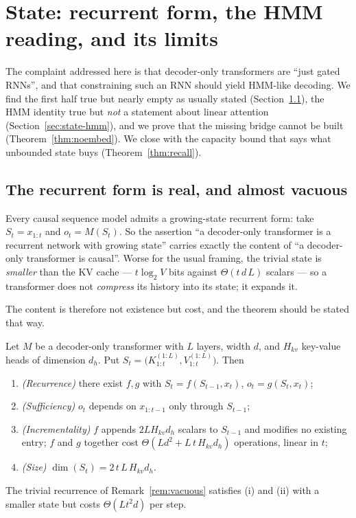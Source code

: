 \section{State: recurrent form, the HMM reading, and its limits}
\label{sec:state}

The complaint addressed here is that decoder-only transformers are ``just gated
RNNs'', and that constraining such an RNN should yield HMM-like decoding. We
find the first half true but nearly empty as usually stated
(Section~\ref{sec:state-form}), the HMM identity true but \emph{not} a statement
about linear attention (Section~\ref{sec:state-hmm}), and we prove that the
missing bridge cannot be built (Theorem~\ref{thm:noembed}). We close with the
capacity bound that says what unbounded state buys
(Theorem~\ref{thm:recall}).

\subsection{The recurrent form is real, and almost vacuous}
\label{sec:state-form}

\begin{remark}
\label{rem:vacuous}
Every causal sequence model admits a growing-state recurrent form: take
$S_t = x_{1:t}$ and $o_t = M(S_t)$. So the assertion ``a decoder-only
transformer is a recurrent network with growing state'' carries exactly the
content of ``a decoder-only transformer is causal''. Worse for the usual
framing, the trivial state is \emph{smaller} than the KV cache --- $t\log_2 V$
bits against $\Theta(t\,d\,L)$ scalars --- so a transformer does not
\emph{compress} its history into its state; it expands it.
\end{remark}

The content is therefore not existence but cost, and the theorem should be
stated that way.

\begin{theorem}
\label{thm:kvform}
Let $M$ be a decoder-only transformer with $L$ layers, width $d$, and $H_{kv}$
key-value heads of dimension $d_h$. Put
$S_t = \big(K^{(1:L)}_{1:t}, V^{(1:L)}_{1:t}\big)$. Then
\begin{enumerate}
  \item[(i)] \emph{(Recurrence)} there exist $f,g$ with $S_t = f(S_{t-1},x_t)$,
        $o_t = g(S_t,x_t)$;
  \item[(ii)] \emph{(Sufficiency)} $o_t$ depends on $x_{1:t-1}$ only through $S_{t-1}$;
  \item[(iii)] \emph{(Incrementality)} $f$ appends $2LH_{kv}d_h$ scalars to
        $S_{t-1}$ and modifies no existing entry; $f$ and $g$ together cost
        $\Theta\!\left(Ld^{2} + L\,t\,H_{kv}d_h\right)$ operations, linear in $t$;
  \item[(iv)] \emph{(Size)} $\dim(S_t) = 2\,t\,L\,H_{kv}d_h$.
\end{enumerate}
The trivial recurrence of Remark~\ref{rem:vacuous} satisfies (i) and (ii) with a
smaller state but costs $\Theta(L t^{2} d)$ per step.
\end{theorem}

